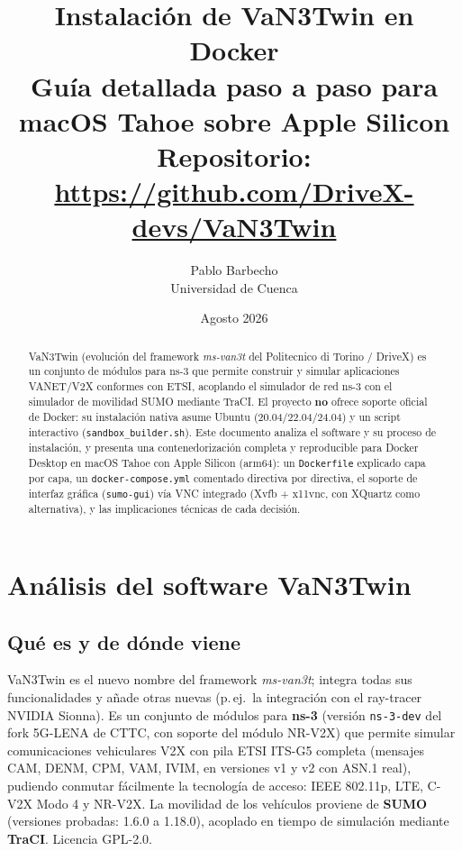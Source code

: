 \documentclass[11pt,a4paper]{article}
\title{\textbf{Instalaci\'on de VaN3Twin en Docker}\\[2mm]
\large Gu\'ia detallada paso a paso para macOS Tahoe sobre Apple Silicon\\[1mm]
\normalsize Repositorio: \url{https://github.com/DriveX-devs/VaN3Twin}}
\author{Pablo Barbecho \\ \small Universidad de Cuenca}
\date{Agosto 2026}
\begin{document}
\maketitle
\thispagestyle{empty}

\begin{abstract}
\noindent
VaN3Twin (evoluci\'on del framework \emph{ms-van3t} del Politecnico di Torino /
DriveX) es un conjunto de m\'odulos para ns-3 que permite construir y simular
aplicaciones VANET/V2X conformes con ETSI, acoplando el simulador de red ns-3
con el simulador de movilidad SUMO mediante TraCI. El proyecto \textbf{no}
ofrece soporte oficial de Docker: su instalaci\'on nativa asume Ubuntu
(20.04/22.04/24.04) y un script interactivo (\texttt{sandbox\_builder.sh}).
Este documento analiza el software y su proceso de instalaci\'on, y presenta
una contenedorizaci\'on completa y reproducible para Docker Desktop en macOS
Tahoe con Apple Silicon (arm64): un \texttt{Dockerfile} explicado capa por
capa, un \texttt{docker-compose.yml} comentado directiva por directiva, el
soporte de interfaz gr\'afica (\texttt{sumo-gui}) v\'ia VNC integrado
(Xvfb + x11vnc, con XQuartz como alternativa), y las
implicaciones t\'ecnicas de cada decisi\'on.
\end{abstract}

\tableofcontents
\newpage

\section{An\'alisis del software VaN3Twin}

\subsection{Qu\'e es y de d\'onde viene}

VaN3Twin es el nuevo nombre del framework \emph{ms-van3t}; integra todas sus
funcionalidades y a\~nade otras nuevas (p.\,ej.\ la integraci\'on con el
ray-tracer NVIDIA Sionna). Es un conjunto de m\'odulos para
\textbf{ns-3} (versi\'on \texttt{ns-3-dev} del fork 5G-LENA de CTTC, con
soporte del m\'odulo NR-V2X) que permite simular comunicaciones vehiculares
V2X con pila ETSI ITS-G5 completa (mensajes CAM, DENM, CPM, VAM, IVIM,
en versiones v1 y v2 con ASN.1 real), pudiendo conmutar f\'acilmente la
tecnolog\'ia de acceso: IEEE 802.11p, LTE, C-V2X Modo 4 y NR-V2X.
La movilidad de los veh\'iculos proviene de \textbf{SUMO} (versiones probadas:
1.6.0 a 1.18.0), acoplado en tiempo de simulaci\'on mediante \textbf{TraCI}.
Licencia GPL-2.0.
\end{document}
